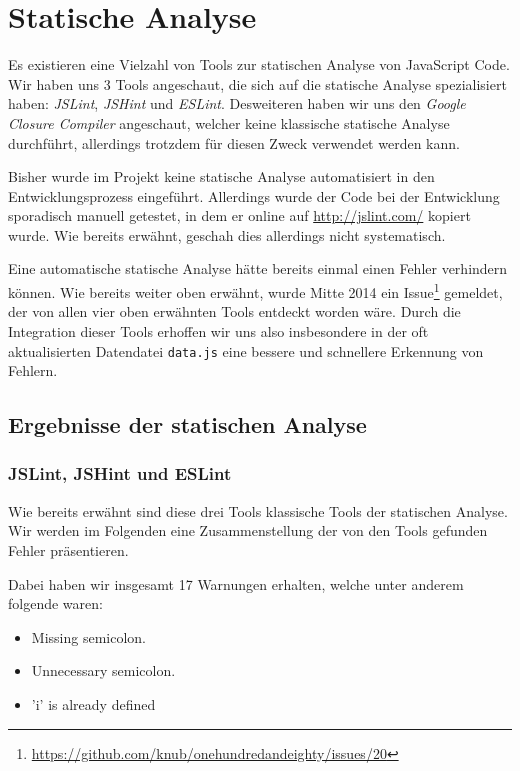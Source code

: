 \documentclass[ngerman]{article}
\begin{document}
\section{Statische Analyse}

Es existieren eine Vielzahl von Tools zur statischen Analyse von JavaScript Code.
Wir haben uns 3 Tools angeschaut, die sich auf die statische Analyse spezialisiert haben: \emph{JSLint}, \emph{JSHint} und \emph{ESLint}.
Desweiteren haben wir uns den \emph{Google Closure Compiler} angeschaut, welcher keine klassische statische Analyse durchführt, allerdings trotzdem für diesen Zweck verwendet werden kann.

Bisher wurde im Projekt keine statische Analyse automatisiert in den Entwicklungsprozess eingeführt.
Allerdings wurde der Code bei der Entwicklung sporadisch manuell getestet, in dem er online auf \url{http://jslint.com/} kopiert wurde.
Wie bereits erwähnt, geschah dies allerdings nicht systematisch.

Eine automatische statische Analyse hätte bereits einmal einen Fehler verhindern können.
Wie bereits weiter oben erwähnt, wurde Mitte 2014 ein Issue\footnote{\url{https://github.com/knub/onehundredandeighty/issues/20}} gemeldet, der von allen vier oben erwähnten Tools entdeckt worden wäre.
Durch die Integration dieser Tools erhoffen wir uns also insbesondere in der oft aktualisierten Datendatei \texttt{data.js} eine bessere und schnellere Erkennung von Fehlern.

\subsection{Ergebnisse der statischen Analyse}
\subsubsection{JSLint, JSHint und ESLint}
Wie bereits erwähnt sind diese drei Tools klassische Tools der statischen Analyse.
Wir werden im Folgenden eine Zusammenstellung der von den Tools gefunden Fehler präsentieren.

Dabei haben wir insgesamt 17 Warnungen erhalten, welche unter anderem folgende waren:

\begin{itemize}
\item Missing semicolon.
\item Unnecessary semicolon.
\item 'i' is already defined
\end{itemize}
\end{document}
